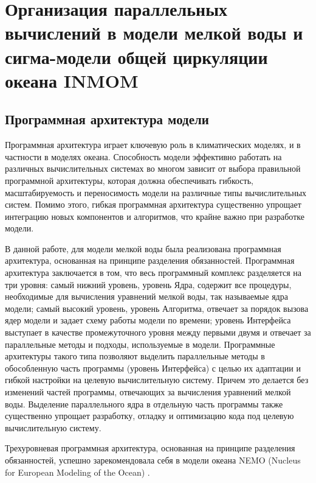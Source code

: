 \chapter{Организация параллельных вычислений в модели мелкой воды и сигма-модели общей циркуляции океана INMOM}\label{ch:ch2}

\section{Программная архитектура модели}\label{sec:ch2/sec1}

Программная архитектура играет ключевую роль в климатических моделях, и в частности в моделях океана.
Способность модели эффективно работать на различных вычислительных системах во многом зависит от выбора правильной программной архитектуры, которая должна обеспечивать гибкость, масштабируемость и переносимость модели на различные типы вычислительных систем.
Помимо этого, гибкая программная архитектура существенно упрощает интеграцию новых компонентов и алгоритмов, что крайне важно при разработке модели.

В данной работе, для модели мелкой воды была реализована программная архитектура, основанная на принципе разделения обязанностей.
Программная архитектура заключается в том, что весь программный комплекс разделяется на три уровня: самый нижний уровень, уровень Ядра, содержит все процедуры, необходимые для вычисления уравнений мелкой воды, так называемые ядра модели; самый высокий уровень, уровень Алгоритма, отвечает за порядок вызова ядер модели и задает схему работы модели по времени; уровень Интерфейса выступает в качестве промежуточного уровня между первыми двумя и отвечает за параллельные методы и подходы, используемые в модели. 
Программные архитектуры такого типа позволяют выделить параллельные методы в обособленную часть программы (уровень Интерфейса) с целью их адаптации и гибкой настройки на целевую вычислительную систему. Причем это делается без изменений частей программы, отвечающих за вычисления уравнений мелкой воды.
Выделение параллельного ядра в отдельную часть программы также существенно упрощает разработку, отладку и оптимизацию кода под целевую вычислительную систему.

Трехуровневая программная архитектура, основанная на принципе разделения обязанностей, успешно зарекомендовала себя в модели океана NEMO (Nucleus for European Modeling of the Ocean) \cite{gmd-11-3447-2018}. 


